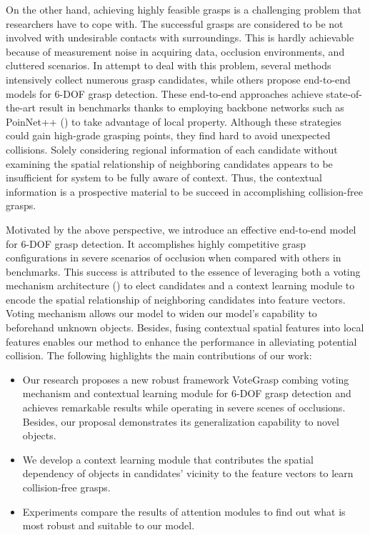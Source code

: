 On the other hand, achieving highly feasible grasps is a challenging problem that researchers have to cope with. The successful grasps are considered to be not involved with undesirable contacts with surroundings. This is hardly achievable because of measurement noise in acquiring data, occlusion environments, and cluttered scenarios. In attempt to deal with this problem, several methods intensively collect numerous grasp candidates, while others propose end-to-end models for 6-DOF grasp detection. These end-to-end approaches achieve state-of-the-art result in benchmarks thanks to employing backbone networks such as PoinNet++ (\textcolor{cyan}{\cite{qi2017pointnet++}}) to take advantage of local property. Although these strategies could gain high-grade grasping points, they find hard to avoid unexpected collisions. Solely considering regional information of each candidate without examining the spatial relationship of neighboring candidates appears to be insufficient for system to be fully aware of context. Thus, the contextual information is a prospective material to be succeed in accomplishing collision-free grasps.

Motivated by the above perspective, we introduce an effective end-to-end model for 6-DOF grasp detection. It accomplishes highly competitive grasp configurations in severe scenarios of occlusion when compared with others in benchmarks. This success is attributed to the essence of leveraging both a voting mechanism architecture (\textcolor{cyan}{\cite{qi2019deep}}) to elect candidates and a context learning module to encode the spatial relationship of neighboring candidates into feature vectors. Voting mechanism allows our model to widen our model's capability to beforehand unknown objects. Besides, fusing contextual spatial features into local features enables our method to enhance the performance in alleviating potential collision. The following highlights the main contributions of our work:

\begin{itemize}
	\item Our research proposes a new robust framework VoteGrasp combing voting mechanism and contextual learning module for 6-DOF grasp detection and achieves remarkable results while operating in severe scenes of occlusions. Besides, our proposal demonstrates its generalization capability to novel objects.
	\item We develop a context learning module that contributes the spatial dependency of objects in candidates’ vicinity to the feature vectors to learn collision-free grasps. 
	\item Experiments compare the results of attention modules to find out what is most robust and suitable to our model.
\end{itemize}
